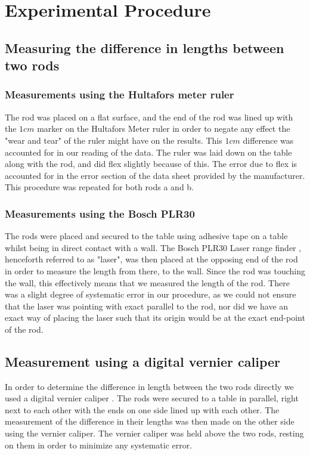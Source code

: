 \documentclass[11pt,a4paper]{article}
\begin{document}
\section{\label{sec:exp_proced}Experimental Procedure}
 
  \subsection{Measuring the difference in lengths between two rods}
    \subsubsection{Measurements using the Hultafors meter ruler}
      The rod was placed on a flat surface, and the end of the rod was lined up with the $1cm$ marker on the Hultafors Meter ruler in order to negate any effect the "wear and tear" of the ruler might have on the results. This $1cm$ difference was accounted for in our reading of the data. The ruler was laid down on the table along with the rod, and did flex slightly because of this. The error due to flex is accounted for in the error section of the data sheet provided by the manufacturer. This procedure was repeated for both rods a and b.

    \subsubsection{Measurements using the Bosch PLR30}
      The rods were placed and secured to the table using adhesive tape on a table whilst being in direct contact with a wall. The Bosch PLR30 Laser range finder \cite{PLR}, henceforth referred to as "laser", was then placed at the opposing end of the rod in order to measure the length from there, to the wall. Since the rod was touching the wall, this effectively means that we measured the length of the rod. There was a slight degree of systematic error in our procedure, as we could not ensure that the laser was pointing with exact parallel to the rod, nor did we have an exact way of placing the laser such that its origin would be at the exact end-point of the rod. 

    \subsection{Measurement using a digital vernier caliper}
      In order to determine the difference in length between the two rods directly we used a digital vernier caliper \cite{cocraft}. The rods were secured to a table in parallel, right next to each other with the ends on one side lined up with each other. The measurement of the difference in their lengths was then made on the other side using the vernier caliper. The vernier caliper was held above the two rods, resting on them in order to minimize any systematic error.
\end{document}
